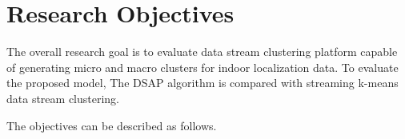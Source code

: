 






\section{Research Objectives}

The overall research goal is to evaluate data stream clustering platform capable of generating micro and macro clusters for indoor localization data. To evaluate the proposed model, The DSAP algorithm is compared with streaming k-means data stream clustering.

The objectives can be described as follows. 

